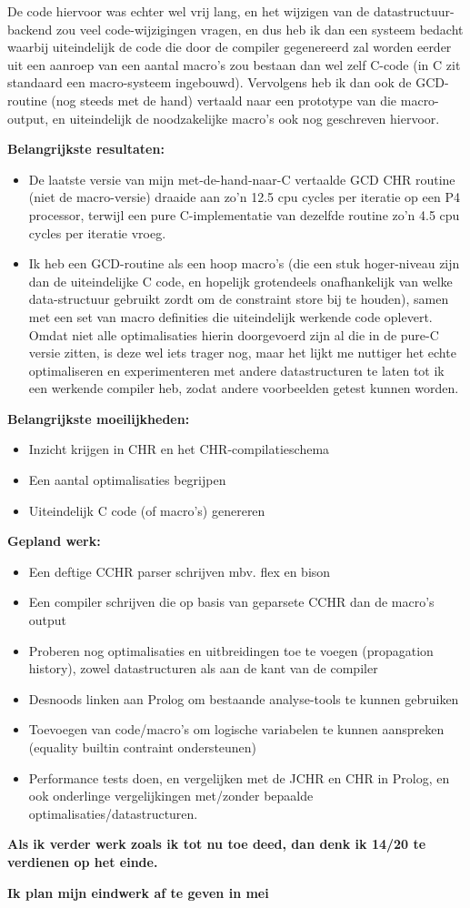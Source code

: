 \documentclass[12pt]{report}
\begin{document}
De code hiervoor was echter wel vrij lang, en het wijzigen van de datastructuur-backend zou veel code-wijzigingen vragen, en dus heb ik dan een systeem bedacht waarbij uiteindelijk de code die door de compiler gegenereerd zal worden eerder uit een aanroep van een aantal macro's zou bestaan dan wel zelf C-code (in C zit standaard een macro-systeem ingebouwd). Vervolgens heb ik dan ook de GCD-routine (nog steeds met de hand) vertaald naar een prototype van die macro-output, en uiteindelijk de noodzakelijke macro's ook nog geschreven hiervoor.

\vspace{1cm}
{\bf Belangrijkste resultaten:}
\begin{itemize}
\item De laatste versie van mijn met-de-hand-naar-C vertaalde GCD CHR routine (niet de macro-versie) draaide aan zo'n 12.5 cpu cycles per iteratie op een P4 processor, terwijl een pure C-implementatie van dezelfde routine zo'n 4.5 cpu cycles per iteratie vroeg. 
\item Ik heb een GCD-routine als een hoop macro's (die een stuk hoger-niveau zijn dan de uiteindelijke C code, en hopelijk grotendeels onafhankelijk van welke data-structuur gebruikt zordt om de constraint store bij te houden), samen met een set van macro definities die uiteindelijk werkende code oplevert. Omdat niet alle optimalisaties hierin doorgevoerd zijn al die in de pure-C versie zitten, is deze wel iets trager nog, maar het lijkt me nuttiger het echte optimaliseren en experimenteren met andere datastructuren te laten tot ik een werkende compiler heb, zodat andere voorbeelden getest kunnen worden.
\end{itemize}
\vspace{1cm}
{\bf Belangrijkste moeilijkheden:}
\begin{itemize}
\item Inzicht krijgen in CHR en het CHR-compilatieschema
\item Een aantal optimalisaties begrijpen
\item Uiteindelijk C code (of macro's) genereren
\end{itemize}

\vspace{1cm}
{\bf Gepland werk:} 
\begin{itemize}
\item Een deftige CCHR parser schrijven mbv. flex en bison
\item Een compiler schrijven die op basis van geparsete CCHR dan de macro's output
\item Proberen nog optimalisaties en uitbreidingen toe te voegen (propagation history), zowel datastructuren als aan de kant van de compiler
\item Desnoods linken aan Prolog om bestaande analyse-tools te kunnen gebruiken
\item Toevoegen van code/macro's om logische variabelen te kunnen aanspreken (equality builtin contraint ondersteunen)
\item Performance tests doen, en vergelijken met de JCHR en CHR in Prolog, en ook onderlinge vergelijkingen met/zonder bepaalde optimalisaties/datastructuren.
\end{itemize}

\vspace{1cm}
{\bf Als ik verder werk zoals ik tot nu toe deed, dan denk ik 14/20 te
    verdienen op het einde.}

{\bf Ik plan mijn eindwerk af te geven in mei}
\end{document}
